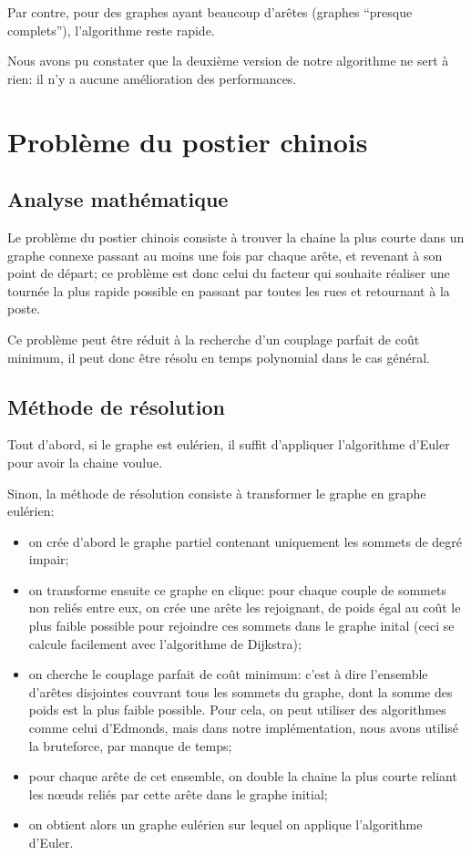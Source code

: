 \documentclass{scrartcl}
\begin{document}
    Par contre, pour des graphes ayant beaucoup d'arêtes (graphes ``presque
    complets''), l'algorithme reste rapide.

    Nous avons pu constater que la deuxième version de notre algorithme ne sert
    à rien: il n'y a aucune amélioration des performances.

\section{Problème du postier chinois}
  \subsection{Analyse mathématique}
    Le problème du postier chinois consiste à trouver la chaine la plus courte
    dans un graphe connexe passant au moins une fois par chaque arête, et
    revenant à son point de départ; ce problème est donc celui du facteur qui
    souhaite réaliser une tournée la plus rapide possible en passant par toutes
    les rues et retournant à la poste. 

    Ce problème peut être réduit à la recherche d'un couplage parfait de coût
    minimum, il peut donc être résolu en temps polynomial dans le cas général.

  \subsection{Méthode de résolution}
    Tout d'abord, si le graphe est eulérien, il suffit d'appliquer l'algorithme
    d'Euler pour avoir la chaine voulue.

    Sinon, la méthode de résolution consiste à transformer le graphe en graphe
    eulérien:
    \begin{itemize}
      \item on crée d'abord le graphe partiel contenant uniquement les sommets
        de degré impair;
      \item on transforme ensuite ce graphe en clique: pour chaque couple de
        sommets non reliés entre eux, on crée une arête les rejoignant,
        de poids égal au coût le plus faible possible pour rejoindre ces
        sommets dans le graphe inital (ceci se calcule facilement avec
        l'algorithme de Dijkstra);
      \item on cherche le couplage parfait de coût minimum: c'est à dire
        l'ensemble d'arêtes disjointes couvrant tous les sommets du graphe,
        dont la somme des poids est la plus faible possible.
        Pour cela, on peut utiliser des algorithmes comme celui d'Edmonds, mais
        dans notre implémentation, nous avons utilisé la bruteforce, par manque
        de temps;
      \item pour chaque arête de cet ensemble, on double la chaine la plus
        courte reliant les nœuds reliés par cette arête dans le graphe initial;
      \item on obtient alors un graphe eulérien sur lequel on applique
        l'algorithme d'Euler.
    \end{itemize}
\end{document}
